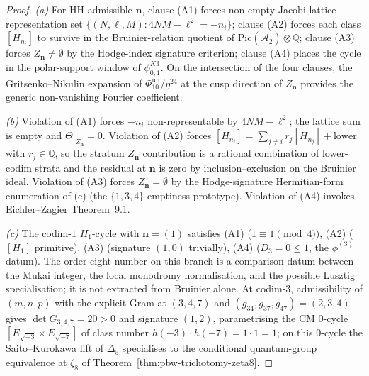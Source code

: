 \begin{proof}
\emph{(a)} For HH-admissible $\mathbf{n}$, clause (A1) forces non-empty Jacobi-lattice representation set $\{(N, \ell, M): 4NM - \ell^2 = -n_i\}$; clause (A2) forces each class $[H_{n_i}]$ to survive in the Bruinier-relation quotient of $\mathrm{Pic}(\overline{\mathcal{A}_2}) \otimes \mathbb{Q}$; clause (A3) forces $Z_{\mathbf{n}} \ne \emptyset$ by the Hodge-index signature criterion; clause (A4) places the cycle in the polar-support window of $\phi^{K3}_{0,1}$. On the intersection of the four clauses, the Gritsenko--Nikulin expansion of $\Phi_{10}^{\mathrm{un}}/\eta^{24}$ at the cusp direction of $Z_{\mathbf{n}}$ provides the generic non-vanishing Fourier coefficient.

\emph{(b)} Violation of (A1) forces $-n_i$ non-representable by $4NM - \ell^2$; the lattice sum is empty and $\Theta|_{Z_{\mathbf{n}}} = 0$. Violation of (A2) forces $[H_{n_i}] = \sum_{j \ne i} r_j [H_{n_j}] + \text{lower}$ with $r_j \in \mathbb{Q}$, so the stratum $Z_{\mathbf{n}}$ contribution is a rational combination of lower-codim strata and the residual at $\mathbf{n}$ is zero by inclusion--exclusion on the Bruinier ideal. Violation of (A3) forces $Z_{\mathbf{n}} = \emptyset$ by the Hodge-signature Hermitian-form enumeration of \cite{VolI}(c) (the $\{1, 3, 4\}$ emptiness prototype). Violation of (A4) invokes Eichler--Zagier Theorem~9.1.

\emph{(c)} The codim-$1$ $H_1$-cycle with $\mathbf{n} = (1)$ satisfies (A1) ($1 \equiv 1 \pmod 4$), (A2) ($[H_1]$ primitive), (A3) (signature $(1, 0)$ trivially), (A4) ($D_3 = 0 \le 1$, the $\phi^{(3)}$ datum). The order-eight number on this branch is a comparison datum between the Mukai integer, the local monodromy normalisation, and the possible Lusztig specialisation; it is not extracted from Bruinier alone. At codim-$3$, admissibility of $(m, n, p)$ with the explicit Gram at $(3, 4, 7)$ and $(g_{34}, g_{37}, g_{47}) = (2, 3, 4)$ gives $\det G_{3,4,7} = 20 > 0$ and signature $(1, 2)$, parametrising the CM $0$-cycle $[E_{\sqrt{-3}} \times E_{\sqrt{-7}}]$ of class number $h(-3) \cdot h(-7) = 1 \cdot 1 = 1$; on this $0$-cycle the Saito--Kurokawa lift of $\Delta_5$ specialises to the conditional quantum-group equivalence at $\zeta_8$ of Theorem~\ref{thm:pbw-trichotomy-zeta8}.
\end{proof}

